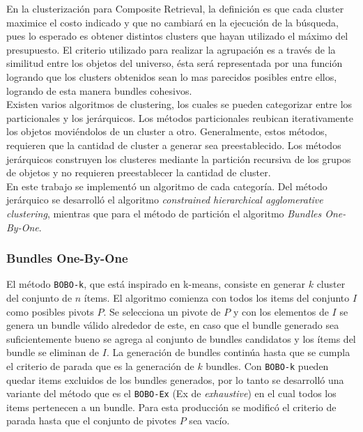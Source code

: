 En la clusterización para Composite Retrieval, la definición es que cada cluster maximice el costo indicado y que no cambiará en la ejecución de la búsqueda, pues lo esperado es obtener distintos clusters que hayan utilizado el máximo del presupuesto. El criterio utilizado para realizar la agrupación es a través de la similitud entre los objetos del universo, ésta será representada por una función logrando que los clusters obtenidos sean lo mas parecidos posibles entre ellos, logrando de esta manera bundles cohesivos.\\
Existen varios algoritmos de clustering, los cuales se pueden categorizar entre los particionales y los jerárquicos. Los métodos particionales reubican iterativamente los objetos moviéndolos de un cluster a otro. Generalmente, estos métodos, requieren que la cantidad de cluster a generar sea preestablecido. Los métodos jerárquicos construyen los clusteres mediante la partición recursiva de los grupos de objetos y no requieren preestablecer la cantidad de cluster.\\
En este trabajo se implementó un algoritmo de cada categoría. Del método jerárquico se desarrolló el algoritmo \textit{constrained hierarchical agglomerative clustering}, mientras que para el método de partición el algoritmo \textit{Bundles One-By-One}.\\

\subsubsection{Bundles One-By-One}
El método \texttt{BOBO-k}, que está inspirado en k-means, consiste en generar $k$ cluster del conjunto de $n$ ítems. El algoritmo comienza con todos los items del conjunto $I$ como posibles pivots $P$. Se selecciona un pivote de $P$ y con los elementos de $I$ se genera un bundle válido alrededor de este, en caso que el bundle generado sea suficientemente bueno se agrega al conjunto de bundles candidatos y los ítems del bundle se eliminan de $I$. La generación de bundles continúa hasta que se cumpla el criterio de parada que es la generación de $k$ bundles. Con \texttt{BOBO-k} pueden quedar items excluidos de los bundles generados, por lo tanto se desarrolló una variante del método que es el \texttt{BOBO-Ex} (Ex de \textit{exhaustive}) en el cual todos los items pertenecen a un bundle. Para esta producción se modificó el criterio de parada hasta que el conjunto de pivotes $P$ sea vacío.\\

